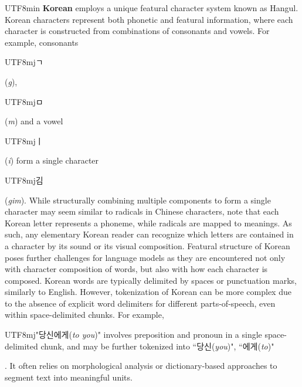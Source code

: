\documentclass{article}
\theoremstyle{plain}
\theoremstyle{definition}
\theoremstyle{remark}
\begin{document}
\begin{CJK}{UTF8}{min}
\textbf{Korean} employs a unique featural character system known as Hangul. Korean characters represent both phonetic and featural information, where each character is constructed from combinations of consonants and vowels. For example, consonants \begin{CJK}{UTF8}{mj}ㄱ\end{CJK}(\textit{g}),\begin{CJK}{UTF8}{mj}ㅁ\end{CJK}(\textit{m}) and a vowel \begin{CJK}{UTF8}{mj}ㅣ\end{CJK}(\textit{i}) form a single character \begin{CJK}{UTF8}{mj}김\end{CJK}(\textit{gim}). While structurally combining multiple components to form a single character may seem similar to radicals in Chinese characters, note that each Korean letter represents a phoneme, while radicals are mapped to meanings. As such, any elementary Korean reader can recognize which letters are contained in a character by its sound or its visual composition. Featural structure of Korean poses further challenges for language models as they are encountered not only with character composition of words, but also with how each character is composed. Korean words are typically delimited by spaces or punctuation marks, similarly to English. However, tokenization of Korean can be more complex due to the absence of explicit word delimiters for different parts-of-speech, even within space-delimited chunks. For example, \begin{CJK}{UTF8}{mj}"당신에게(\textit{to you})" involves preposition and pronoun in a single space-delimited chunk, and may be further tokenized into ``당신(\textit{you})", ``에게(\textit{to})"\end{CJK}. It often relies on morphological analysis or dictionary-based approaches to segment text into meaningful units.



\end{CJK}
\end{document}
